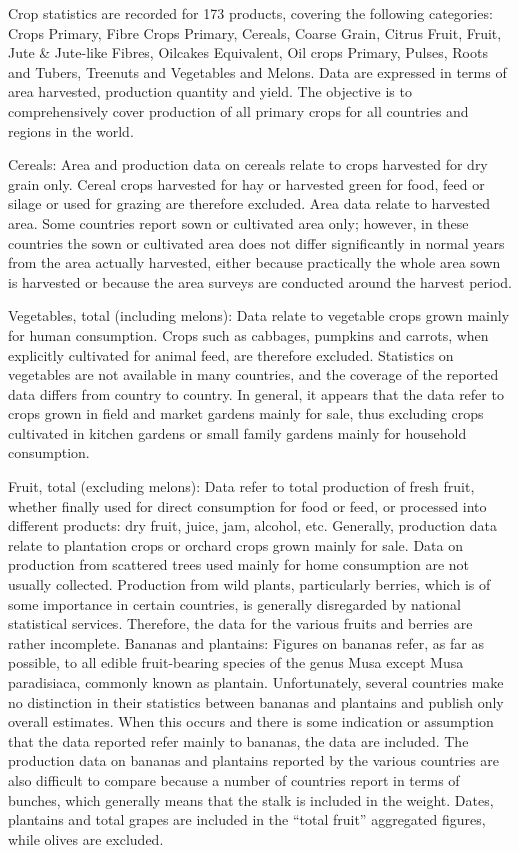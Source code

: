 \documentclass[11pt]{article}
\begin{document}
Crop statistics are recorded for 173 products, covering the following
categories: Crops Primary, Fibre Crops Primary, Cereals, Coarse Grain,
Citrus Fruit, Fruit, Jute \& Jute-like Fibres, Oilcakes Equivalent, Oil
crops Primary, Pulses, Roots and Tubers, Treenuts and Vegetables and
Melons. Data are expressed in terms of area harvested, production
quantity and yield. The objective is to comprehensively cover production
of all primary crops for all countries and regions in the world.

Cereals: Area and production data on cereals relate to crops harvested
for dry grain only. Cereal crops harvested for hay or harvested green
for food, feed or silage or used for grazing are therefore excluded.
Area data relate to harvested area. Some countries report sown or
cultivated area only; however, in these countries the sown or cultivated
area does not differ significantly in normal years from the area
actually harvested, either because practically the whole area sown is
harvested or because the area surveys are conducted around the harvest
period.

Vegetables, total (including melons): Data relate to vegetable crops
grown mainly for human consumption. Crops such as cabbages, pumpkins and
carrots, when explicitly cultivated for animal feed, are therefore
excluded. Statistics on vegetables are not available in many countries,
and the coverage of the reported data differs from country to country.
In general, it appears that the data refer to crops grown in field and
market gardens mainly for sale, thus excluding crops cultivated in
kitchen gardens or small family gardens mainly for household
consumption.

Fruit, total (excluding melons): Data refer to total production of fresh
fruit, whether finally used for direct consumption for food or feed, or
processed into different products: dry fruit, juice, jam, alcohol, etc.
Generally, production data relate to plantation crops or orchard crops
grown mainly for sale. Data on production from scattered trees used
mainly for home consumption are not usually collected. Production from
wild plants, particularly berries, which is of some importance in
certain countries, is generally disregarded by national statistical
services. Therefore, the data for the various fruits and berries are
rather incomplete. Bananas and plantains: Figures on bananas refer, as
far as possible, to all edible fruit-bearing species of the genus Musa
except Musa paradisiaca, commonly known as plantain. Unfortunately,
several countries make no distinction in their statistics between
bananas and plantains and publish only overall estimates. When this
occurs and there is some indication or assumption that the data reported
refer mainly to bananas, the data are included. The production data on
bananas and plantains reported by the various countries are also
difficult to compare because a number of countries report in terms of
bunches, which generally means that the stalk is included in the weight.
Dates, plantains and total grapes are included in the ``total fruit''
aggregated figures, while olives are excluded.
\end{document}
